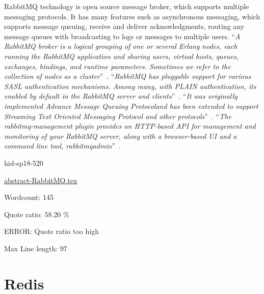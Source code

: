 RabbitMQ technology is open source message broker, which supports multiple 
messaging protocols. It has many features such as asynchronous messaging, 
which supports message queuing, receive and deliver acknowledgments, routing
any message queues with broadcasting to logs or messages to multiple users.
\color{blue}``\emph{A RabbitMQ broker is a logical grouping of one or
several Erlang nodes, each running the RabbitMQ application and sharing users,
virtual hosts, queues, exchanges, bindings, and runtime parameters. Sometimes 
we refer to the collection of nodes as a 
cluster}''\color{black}~\cite{hid-sp18-520-RabbitMQCluster}.
\color{blue}``\emph{RabbitMQ has pluggable support for various SASL authentication mechanisms. 
Among many, with PLAIN authentication, its enabled by default in the RabbitMQ 
server and clients}''\color{black}~\cite{hid-sp18-520-RabbitMQauth}.
\color{blue}``\emph{It was originally implemented Advance Message Queuing Protocoland has been 
extended to support Streaming Text Oriented Messaging Protocol and other 
protocols}''\color{black}~\cite{hid-sp18-520-RabbitMQ-wiki}.
\color{blue}``\emph{The rabbitmq-management plugin provides an HTTP-based API for management and 
monitoring of your RabbitMQ server, along with a browser-based UI and a 
command line tool, rabbitmqadmin}''\color{black}~\cite{hid-sp18-520-RabbitMQ-mana}.


\begin{IU}

hid-sp18-520

\href{https://github.com/cloudmesh-community/hid-sp18-520/blob/master//technology/abstract-RabbitMQ.tex}{abstract-RabbitMQ.tex}

 

Wordcount: 145


Quote ratio: 58.20 \%

ERROR: Quote ratio too high
 
Max Line length: 97
\end{IU}

\section{Redis}

